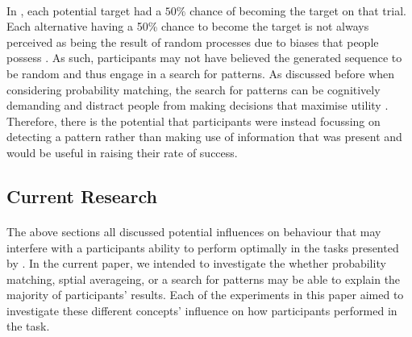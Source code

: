 \documentclass[12pt]{article}
\begin{document}
\paragraph{} In \cite{clarke2015failure}, each potential target had a $50\%$ chance of becoming the target on that trial. Each alternative having a 50\% chance to become the target is not always perceived as being the result of random processes due to biases that people possess \citep{Ayton2004}. As such, participants may not have believed the generated sequence to be random and thus engage in a search for patterns. As discussed before when considering probability matching, the search for patterns can be cognitively demanding and distract people from making decisions that maximise utility \citep{wolford2004searching}. Therefore, there is the potential that participants were instead focussing on detecting a pattern rather than making use of information that was present and would be useful in raising their rate of success. 

\subsection*{Current Research}

\paragraph{} The above sections all discussed potential influences on behaviour that may interfere with a participants ability to perform optimally in the tasks presented by \cite{clarke2015failure}. In the current paper, we intended to investigate the whether probability matching, sptial averageing, or a search for patterns may be able to explain the majority of participants' results. Each of the experiments in this paper aimed to investigate these different concepts' influence on how participants performed in the task. 
\end{document}
